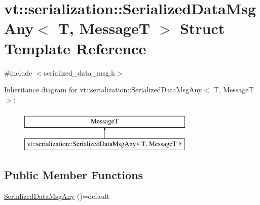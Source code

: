 \hypertarget{structvt_1_1serialization_1_1_serialized_data_msg_any}{}\section{vt\+:\+:serialization\+:\+:Serialized\+Data\+Msg\+Any$<$ T, MessageT $>$ Struct Template Reference}
\label{structvt_1_1serialization_1_1_serialized_data_msg_any}


{\ttfamily \#include $<$serialized\+\_\+data\+\_\+msg.\+h$>$}

Inheritance diagram for vt\+:\+:serialization\+:\+:Serialized\+Data\+Msg\+Any$<$ T, MessageT $>$\+:\begin{figure}[H]
\begin{center}
\leavevmode
\includegraphics[height=2.000000cm]{structvt_1_1serialization_1_1_serialized_data_msg_any}
\end{center}
\end{figure}
\subsection*{Public Member Functions}
\begin{DoxyCompactItemize}
\item 
\hyperlink{structvt_1_1serialization_1_1_serialized_data_msg_any_abeedde83aef6f281849634198e997a78}{Serialized\+Data\+Msg\+Any} ()=default
\end{DoxyCompactItemize}
